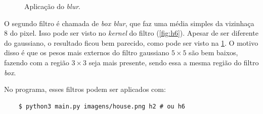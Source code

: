 \begin{figure}[H]
    \caption{Aplicação do \textit{blur}.}
    \label{fig:blur}
\end{figure}

O segundo filtro é chamada de \textit{box blur}, que faz uma média simples da vizinhaça 8 do pixel. Isso pode ser visto no \textit{kernel} do filtro (\cref{fig:h6}). Apesar de ser diferente do gaussiano, o resultado ficou bem parecido, como pode ser visto na \cref{fig:blur}. O motivo disso é que os pesos mais externos do filtro gaussiano $5 \times 5$ são bem baixos, fazendo com a região $3 \times 3$ seja mais presente, sendo essa a mesma região do filtro \textit{box}.

No programa, esses filtros podem ser aplicados com: \enlargethispage{20pt}

\begin{verbatim}
    $ python3 main.py imagens/house.png h2 # ou h6
\end{verbatim}

